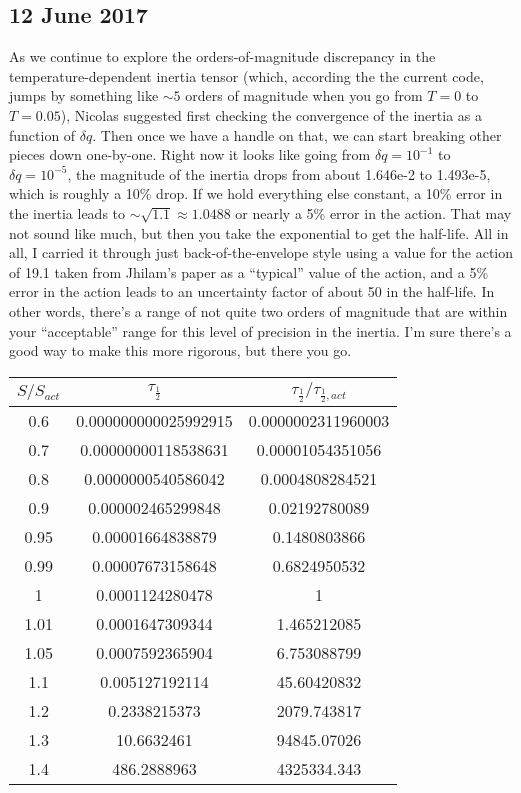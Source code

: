 \subsection*{12 June 2017}
As we continue to explore the orders-of-magnitude discrepancy in the temperature-dependent inertia tensor (which, according the the current code, jumps by something like $\sim 5$ orders of magnitude when you go from $T=0$ to $T=0.05$), Nicolas suggested first checking the convergence of the inertia as a function of $\delta q$. Then once we have a handle on that, we can start breaking other pieces down one-by-one. Right now it looks like going from $\delta q=10^{-1}$ to $\delta q=10^{-5}$, the magnitude of the inertia drops from about 1.646e-2 to 1.493e-5, which is roughly a 10\% drop. If we hold everything else constant, a 10\% error in the inertia leads to $\sim\sqrt{1.1}\approx1.0488$ or nearly a 5\% error in the action. That may not sound like much, but then you take the exponential to get the half-life. All in all, I carried it through just back-of-the-envelope style using a value for the action of 19.1 taken from Jhilam's paper as a ``typical'' value of the action, and a 5\% error in the action leads to an uncertainty factor of about 50 in the half-life. In other words, there's a range of not quite two orders of magnitude that are within your ``acceptable'' range for this level of precision in the inertia. I'm sure there's a good way to make this more rigorous, but there you go.

\begin{tabular}{ccc}
$S/S_{act}$ & $\tau_\frac{1}{2}$ & $\tau_\frac{1}{2}/\tau_{\frac{1}{2},act}$
\\ \hline
0.6 &	0.000000000025992915 &	0.0000002311960003 \\
0.7 &	0.00000000118538631 &	0.00001054351056 \\
0.8 &	0.0000000540586042 &	0.0004808284521 \\
0.9 &	0.000002465299848 &	0.02192780089 \\
0.95 &	0.00001664838879 &	0.1480803866 \\
0.99 &	0.00007673158648 &	0.6824950532 \\
1 &	0.0001124280478 &	1 \\
1.01 &	0.0001647309344 &	1.465212085 \\
1.05 &	0.0007592365904 &	6.753088799 \\
1.1 &	0.005127192114 &	45.60420832 \\
1.2 &	0.2338215373 &	2079.743817 \\
1.3 &	10.6632461 &	94845.07026 \\
1.4 &	486.2888963 &	4325334.343 \\


\end{tabular}

